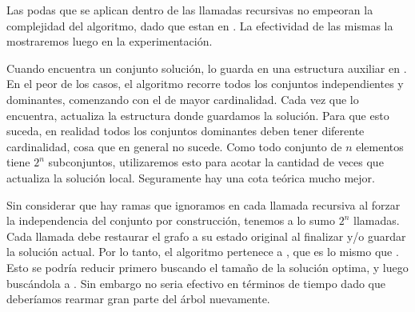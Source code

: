 Las podas que se aplican dentro de las llamadas recursivas no empeoran la complejidad del algoritmo, dado que estan en . La efectividad de las mismas la mostraremos luego en la experimentación.

Cuando encuentra un conjunto solución, lo guarda en una estructura auxiliar en . En el peor de los casos, el algoritmo recorre todos los conjuntos independientes y dominantes, comenzando con el de mayor cardinalidad. Cada vez que lo encuentra, actualiza la estructura donde guardamos la solución. Para que esto suceda, en realidad todos los conjuntos dominantes deben tener diferente cardinalidad, cosa que en general no sucede. Como todo conjunto de $n$ elementos tiene $2^n$ subconjuntos, utilizaremos esto para acotar la cantidad de veces que actualiza la solución local. Seguramente hay una cota teórica mucho mejor.

Sin considerar que hay ramas que ignoramos en cada llamada recursiva al forzar la independencia del conjunto por construcción, tenemos a lo sumo $2^n$ llamadas. Cada llamada debe restaurar el grafo a su estado original al finalizar y/o guardar la solución actual. Por lo tanto, el algoritmo pertenece a , que es lo mismo que . Esto se podría reducir primero buscando el tamaño de la solución optima, y luego buscándola a . Sin embargo no seria efectivo en términos de tiempo dado que deberíamos rearmar gran parte del árbol nuevamente.

